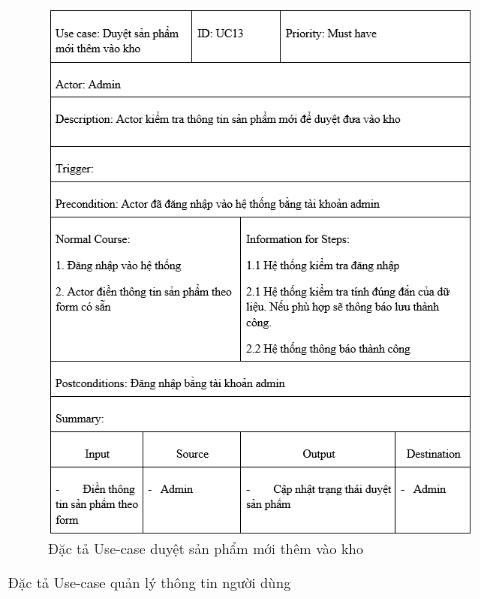 \documentclass{article}
\begin{document}
{{{{{{{{{{{{{	\begin{center}
		\begin{figure}[htp]
			\begin{center}
				\includegraphics[scale=.950]{anh23.png}
			\end{center}
			\caption{Đặc tả Use-case duyệt sản phẩm mới thêm vào kho}
			
		\end{figure}
	\end{center}
\newpage
{\large Đặc tả Use-case quản lý thông tin người dùng
	
}}}}}}}}}}}}}}
\end{document}
